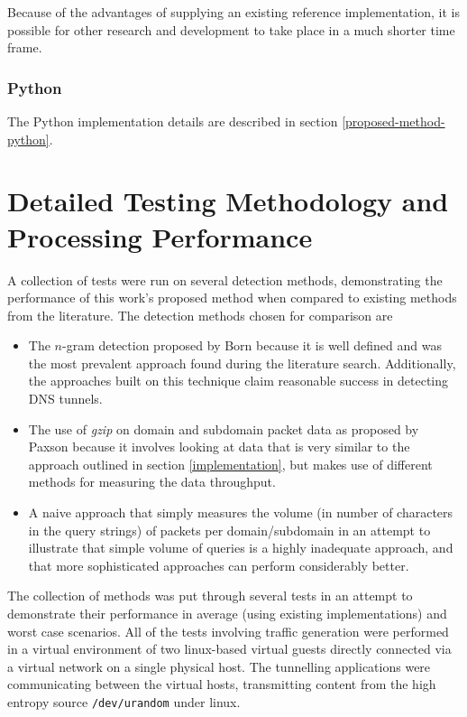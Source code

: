 \documentclass[12pt]{report}
\theoremstyle{remark}
\theoremstyle{definition}
\theoremstyle{definition}
\theoremstyle{definition}
\begin{document}
Because of the advantages of supplying an existing reference implementation, it
is possible for other research and development to take place in a much shorter
time frame.

\subsection{Python}

The Python implementation details are described in section
\ref{proposed-method-python}.

\chapter{Detailed Testing Methodology and Processing Performance}
A collection of tests were run on several detection methods, demonstrating the
performance of this work's proposed method when compared to existing methods
from the literature. The detection methods chosen for comparison are

\label{chosen-methods}
\begin{itemize}

\item The $n$-gram detection proposed by Born\cite{Born2010.cfa} because it is
well defined and was the most prevalent approach found during the literature
search. Additionally, the approaches built on this technique claim reasonable
success in detecting DNS tunnels.

\item The use of \emph{gzip} on domain and subdomain packet data as proposed by
Paxson\cite{Paxson2011} because it involves looking at data that is very similar
to the approach outlined in section \ref{implementation}, but makes use of
different methods for measuring the data throughput.

\item A naive approach that simply measures the volume (in number of characters
in the query strings) of packets per domain/subdomain in an attempt to
illustrate that simple volume of queries is a highly inadequate approach, and
that more sophisticated approaches can perform considerably better.
\end{itemize}

The collection of methods was put through several tests in an attempt to
demonstrate their performance in average (using existing implementations) and
worst case scenarios. All of the tests involving traffic generation were
performed in a virtual environment of two linux-based virtual guests directly
connected via a virtual network on a single physical host. The tunnelling
applications were communicating between the virtual hosts, transmitting content
from the high entropy source \texttt{/dev/urandom} under linux.
\end{document}
